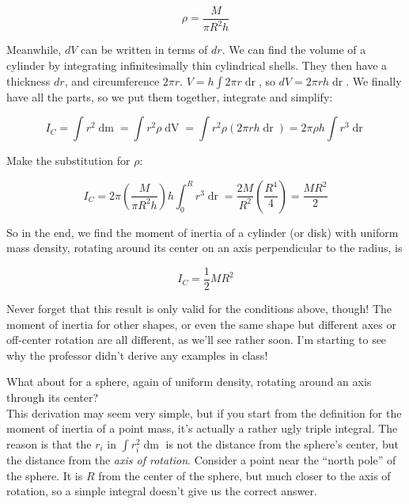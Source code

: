 \documentclass[8.01x]{subfiles}
\begin{document}
\begin{equation}
\rho = \frac{M}{\pi R^2 h}
\end{equation}

Meanwhile, $dV$ can be written in terms of $dr$. We can find the volume of a cylinder by integrating infinitesimally thin cylindrical shells. They then have a thickness $dr$, and circumference $2 \pi r$. $V = h \int 2 \pi r \mathop{dr}$, so $dV = 2 \pi r h \mathop{dr}$. We finally have all the parts, so we put them together, integrate and simplify:

\begin{equation}
I_C = \int r^2 \mathop{dm} = \int r^2 \rho \mathop{dV} = \int r^2 \rho (2 \pi r h \mathop{dr}) = 2 \pi \rho h \int r^3 \mathop{dr}
\end{equation}

Make the substitution for $\rho$:

\begin{equation}
I_C = 2 \pi \left( \frac{M}{\pi R^2 h}\right) h \int_0^R r^3 \mathop{dr} = \frac{2 M}{R^2} \left(\frac{R^4}{4}\right) = \frac{M R^2}{2}
\end{equation}

So in the end, we find the moment of inertia of a cylinder (or disk) with uniform mass density, rotating around its center on an axis perpendicular to the radius, is 

\begin{equation}
I_C = \frac{1}{2} M R^2
\end{equation}

Never forget that this result is only valid for the conditions above, though! The moment of inertia for other shapes, or even the same shape but different axes or off-center rotation are all different, as we'll see rather soon. I'm starting to see why the professor didn't derive any examples in class!

What about for a sphere, again of uniform density, rotating around an axis through its center?\\
This derivation may seem very simple, but if you start from the definition for the moment of inertia of a point mass, it's actually a rather ugly triple integral. The reason is that the $r_i$ in $\int r_i^2 \mathop{dm}$ is not the distance from the sphere's center, but the distance from the \emph{axis of rotation}. Consider a point near the ``north pole'' of the sphere. It is $R$ from the center of the sphere, but much closer to the axis of rotation, so a simple integral doesn't give us the correct answer.
\end{document}
